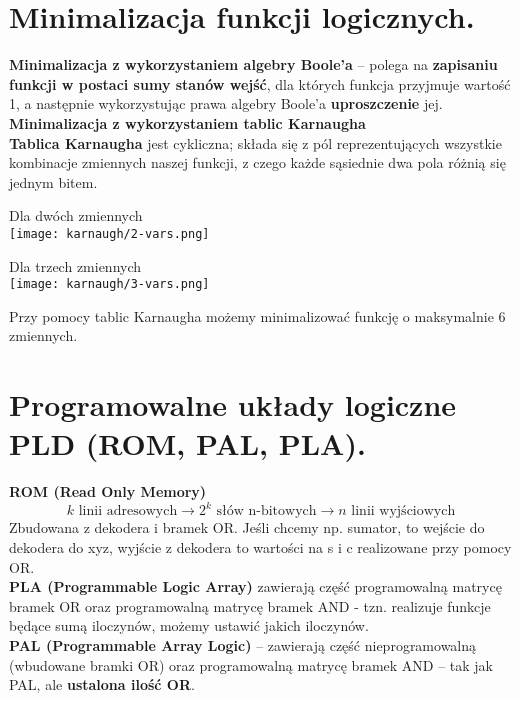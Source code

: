 \documentclass[main.tex]{subfiles}
\begin{document}
    \section{Minimalizacja funkcji logicznych.}

    \textbf{Minimalizacja z wykorzystaniem algebry Boole'a} -- polega na \textbf{zapisaniu funkcji w postaci sumy stanów wejść},
    dla których funkcja przyjmuje wartość 1, a następnie wykorzystując prawa algebry Boole'a \textbf{uproszczenie} jej.\\

    \noindent \textbf{Minimalizacja z wykorzystaniem tablic Karnaugha}\\
    \textbf{Tablica Karnaugha} jest cykliczna; składa się z pól reprezentujących wszystkie kombinacje zmiennych naszej
    funkcji, z czego każde sąsiednie dwa pola różnią się jednym bitem.

    \begin{center}
        Dla dwóch zmiennych \\
        \texttt{[image: karnaugh/2-vars.png]}

        Dla trzech zmiennych \\
        \texttt{[image: karnaugh/3-vars.png]}
    \end{center}
    Przy pomocy tablic Karnaugha możemy minimalizować funkcję o maksymalnie 6 zmiennych.


    \section{Programowalne układy logiczne PLD (ROM, PAL, PLA).}

    \textbf{ROM (Read Only Memory)}
    \[ k \text{ linii adresowych} \rightarrow 2^k \text{ słów n-bitowych} \rightarrow n \text{ linii wyjściowych}\]
    Zbudowana z dekodera i bramek OR. Jeśli chcemy np. sumator, to wejście do dekodera do xyz, wyjście z dekodera
    to wartości na s i c realizowane przy pomocy OR.\\

    \noindent \textbf{PLA (Programmable Logic Array)} zawierają część programowalną matrycę bramek OR oraz programowalną
    matrycę bramek AND - tzn. realizuje funkcje będące sumą iloczynów, możemy ustawić jakich iloczynów.\\

    \noindent \textbf{PAL (Programmable Array Logic)} -- zawierają część nieprogramowalną (wbudowane bramki OR) oraz programowalną
    matrycę bramek AND -- tak jak PAL, ale \textbf{ustalona ilość OR}.
\end{document}
